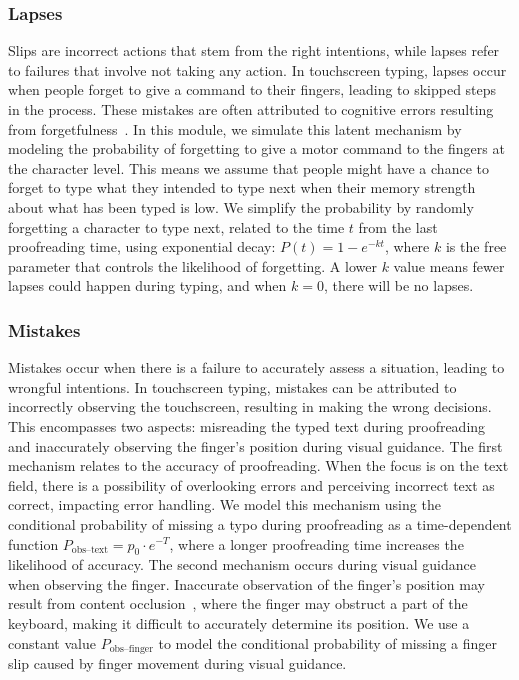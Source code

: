 \subsubsection{Lapses}

Slips are incorrect actions that stem from the right intentions, while lapses refer to failures that involve not taking any action. In touchscreen typing, lapses occur when people forget to give a command to their fingers, leading to skipped steps in the process. These mistakes are often attributed to cognitive errors resulting from forgetfulness~\cite{nicolau2012elderly}.
In this module, we simulate this latent mechanism by modeling the probability of forgetting to give a motor command to the fingers at the character level. This means we assume that people might have a chance to forget to type what they intended to type next when their memory strength about what has been typed is low.
We simplify the probability by randomly forgetting a character to type next, related to the time $t$ from the last proofreading time, using exponential decay: $P(t) = 1 - e^{-kt}$, where $k$ is the free parameter that controls the likelihood of forgetting. A lower $k$ value means fewer lapses could happen during typing, and when $k = 0$, there will be no lapses.


\subsubsection{Mistakes}

Mistakes occur when there is a failure to accurately assess a situation, leading to wrongful intentions. In touchscreen typing, mistakes can be attributed to incorrectly observing the touchscreen, resulting in making the wrong decisions. This encompasses two aspects: misreading the typed text during proofreading and inaccurately observing the finger's position during visual guidance.
The first mechanism relates to the accuracy of proofreading. When the focus is on the text field, there is a possibility of overlooking errors and perceiving incorrect text as correct, impacting error handling. We model this mechanism using the conditional probability of missing a typo during proofreading as a time-dependent function $P_{\text {obs--text}}= p_0 \cdot e^{-T}$, where a longer proofreading time increases the likelihood of accuracy.
The second mechanism occurs during visual guidance when observing the finger. Inaccurate observation of the finger's position may result from content occlusion~\cite{baudisch2009back}, where the finger may obstruct a part of the keyboard, making it difficult to accurately determine its position. We use a constant value $P_{\text {obs--finger}}$ to model the conditional probability of missing a finger slip caused by finger movement during visual guidance.


